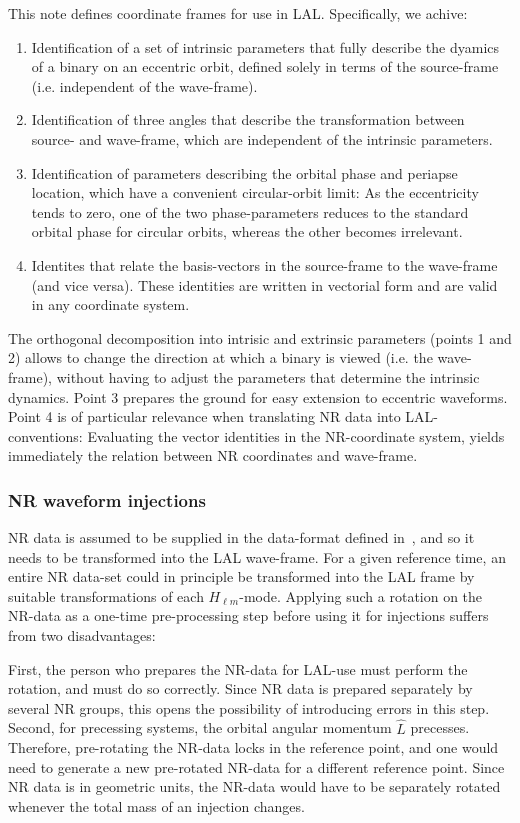 \documentclass[aps,prd,amssymb,amsmath,amsfonts,superscriptaddress,
floatfix ,preprintnumbers,altaffilletter]{revtex4}
\newcommand{\lNR}{\hat L}
\begin{document}
This note defines coordinate frames for use in LAL.  Specifically, we
achive:
\begin{enumerate}
  \item Identification of a set of intrinsic parameters that fully
    describe the dyamics of a binary on an eccentric orbit,
    defined solely in terms of the source-frame (i.e. independent of
    the wave-frame).
  \item Identification of three angles that describe the
    transformation between source- and wave-frame, which are
    independent of the intrinsic parameters.
  \item Identification of parameters describing the orbital phase and
    periapse location, which have a convenient circular-orbit limit:
    As the eccentricity tends to zero, one of the two phase-parameters
    reduces to the standard orbital phase for circular orbits, whereas
    the other becomes irrelevant.
  \item Identites that relate the basis-vectors in the source-frame to the
    wave-frame (and vice versa).  These identities are written in
    vectorial form and are valid in any coordinate system.
\end{enumerate}

The orthogonal decomposition into intrisic and extrinsic parameters
(points 1 and 2) allows to change the direction at which a binary is
viewed (i.e. the wave-frame), without having to adjust the parameters
that determine the intrinsic dynamics.  Point 3 prepares the ground
for easy extension to eccentric waveforms.
Point 4 is of particular relevance when translating NR data into
LAL-conventions: Evaluating the vector identities in the NR-coordinate
system, yields immediately the relation between NR coordinates and
wave-frame.


\subsubsection{NR waveform injections}

NR data is assumed to be supplied in the data-format defined
in~\cite{Brown:2007jx}, and so it needs to be transformed into the LAL
wave-frame.  For a given reference time, an entire NR data-set could
in principle be transformed into the LAL frame by suitable
transformations of each $H_{\ell m}$-mode.  Applying such a rotation
on the NR-data as a one-time pre-processing step before using it for
injections suffers from two disadvantages:

First, the person who prepares the NR-data for LAL-use must perform
the rotation, and must do so correctly. Since NR data is prepared
separately by several NR groups, this opens the possibility of
introducing errors in this step.  Second, for precessing systems, the
orbital angular momentum $\lNR$ precesses.  Therefore, pre-rotating
the NR-data locks in the reference point, and one would need to
generate a new pre-rotated NR-data for a different reference point.
Since NR data is in geometric units, the NR-data would have to be
separately rotated whenever the total mass of an injection changes.
\end{document}
